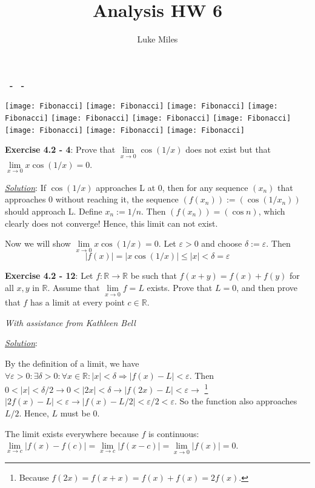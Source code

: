 \documentclass{article}
\title{Analysis HW 6}
\author{Luke Miles}
\begin{document}
\raggedright %
\renewcommand{\thefootnote}{\fnsymbol{footnote}} %

\makeatletter
\textbf{\@title\ - \@author\ - \@date}
\makeatother

\centerline{
\texttt{[image: Fibonacci]}
\texttt{[image: Fibonacci]}
\texttt{[image: Fibonacci]}
\texttt{[image: Fibonacci]}
\texttt{[image: Fibonacci]}
\texttt{[image: Fibonacci]}
\texttt{[image: Fibonacci]}
\texttt{[image: Fibonacci]}
\texttt{[image: Fibonacci]}
\texttt{[image: Fibonacci]}
}

\hrulefill

\textbf{Exercise 4.2 - 4}: Prove that $\lim\limits_{x \to 0} \cos(1/x)$
does not exist but that $\lim\limits_{x \to 0} x \cos(1/x) = 0$.

\underline{\textit{Solution}}:
If $\cos(1/x)$ approaches L at 0, then for any sequence $(x_n)$ that
approaches 0 without reaching it, the sequence $(f(x_n)) := (\cos (1/x_n))$
should approach L.  Define $x_n := 1/n$. Then $(f(x_n)) = (\cos n)$, which
clearly does not converge! Hence, this limit can not exist.

Now we will show $\lim\limits_{x \to 0} x \cos(1/x) = 0$. Let
$\varepsilon > 0$ and choose $\delta := \varepsilon$. Then
\[ |f(x)| = |x \cos (1/x)| \leq |x| < \delta = \varepsilon \]

\hrulefill

\textbf{Exercise 4.2 - 12}: 
Let $f: \mathbb R \to \mathbb R$ be such that $f(x+y)=f(x)+f(y)$ for all
$x, y$ in $\mathbb R$. Assume that $\lim\limits_{x \to 0} f = L$ exists.
Prove that $L=0$, and then prove that $f$ has a limit at every point
$c \in \mathbb R$.

\textit{With assistance from Kathleen Bell}

\underline{\textit{Solution}}:

By the definition of a limit, we have
$\forall \varepsilon > 0: \exists \delta > 0: \forall x \in \mathbb R:
|x| < \delta \Rightarrow |f(x) - L| < \varepsilon$.
Then $0 < |x| < \delta/2 \rightarrow 0 < |2x| < \delta \rightarrow
|f(2x) - L| < \varepsilon \rightarrow$
\footnote{Because $f(2x) = f(x+x) = f(x)+f(x) = 2f(x)$.}
$|2f(x) - L| < \varepsilon
\rightarrow |f(x) - L/2| < \varepsilon/2 < \varepsilon$. So the function
also approaches $L/2$. Hence, $L$ must be 0.

The limit exists everywhere because $f$ is continuous:
$\lim\limits_{x \to c} |f(x) - f(c)|
= \lim\limits_{x \to c} |f(x-c)|
= \lim\limits_{x \to 0} |f(x)|
= 0$.
\end{document}
